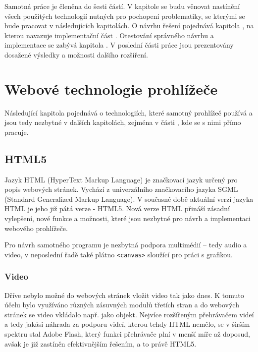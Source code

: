 Samotná práce je členěna do šesti částí. V kapitole  se budu věnovat nastínění všech použitých technologií nutných pro pochopení problematiky, se kterými se bude pracovat v následujících kapitolách. O návrhu řešení pojednává kapitola , na kterou navazuje implementační část . Otestování správného návrhu a implementace se zabývá kapitola  . V poslední části práce  jsou prezentovány dosažené výsledky a možnosti dalšího rozšíření.




\chapter{Webové technologie prohlížeče}
\label{chapter:2}
Následující kapitola pojednává o technologiích, které samotný prohlížeč používá a jsou tedy nezbytné v dalších kapitolách, zejména v části , kde se s nimi přímo pracuje.


\section{HTML5}

Jazyk HTML (HyperText Markup Language) je značkovací jazyk určený pro popis webových stránek. Vychází z univerzálního značkovacího jazyka SGML (Standard Generalized Markup Language). V současné době aktuální verzí  jazyka HTML je jeho již pátá verze -  HTML5. Nová verze HTML přináší zásadní vylepšení, nové funkce a možnosti, které jsou nezbytné pro návrh a implementaci webového prohlížeče. 

Pro návrh samotného programu je nezbytná podpora multimédií – tedy audio a video, v neposlední řadě také plátno \texttt{<canvas>} sloužící pro práci s grafikou.



\subsection{Video}
Dříve nebylo možné do webových stránek vložit video tak jako dnes. K tomuto účelu bylo využíváno různých zásuvných modulů třetích stran a do webových stránek se video vkládalo např. jako objekt. Nejvíce rozšířeným přehrávačem videí a tedy jakási náhrada za podporu videí, kterou tehdy HTML nemělo, se v širším spektru stal Adobe Flash, který funkci přehrávače plní v menší míře až doposud, avšak je již zastíněn efektivnějším řešením, a to právě HTML5. \cite{HTML5aCSS3}

